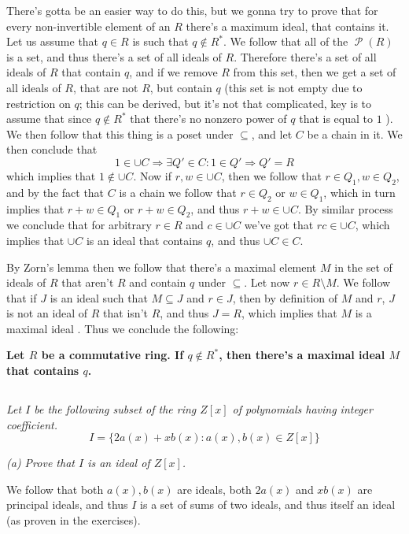 \documentclass[11pt,oneside,titlepage]{book}
\DeclareMathOperator \pow {\mathcal {P}}
\DeclareMathOperator \ra {\Rightarrow}
\newcommand{\set}[1]{\{ #1 \}}
\begin{document}
There's gotta be an easier way to do this, but we gonna try to prove
that for every non-invertible element of an $R$ there's a maximum
ideal, that contains it. Let us assume that $q \in R$ is such that $q
\notin R^*$. We follow that all of the $\pow(R)$ is a set, and thus
there's a set of all ideals of $R$. Therefore there's a set of all
ideals of $R$ that contain $q$, and if we remove $R$ from this set,
then we get a set of all ideals of $R$, that are not $R$, but contain
$q$ (this set is not empty due to restriction on $q$; this can be
derived, but it's not that complicated, key is to assume that since $q
\notin R^*$ that there's no nonzero power of $q$ that is equal to $1$
). We then follow that this thing is a poset under $\subseteq$, and
let $C$ be a chain in it. We then conclude that
$$1 \in \cup C \ra \exists Q' \in C: 1 \in Q' \ra Q' = R$$
which implies that $1 \notin \cup C$. Now if $r, w \in \cup C$, then
we follow that $r \in Q_1, w \in Q_2$, and by the fact that $C$ is a
chain we follow that $r \in Q_2$ or $w \in Q_1$, which in turn implies
that $r + w \in Q_1$ or $r + w \in Q_2$, and thus $r + w \in \cup
C$. By similar process we conclude that for arbitrary $r \in R$ and $c
\in \cup C$ we've got that $rc \in \cup C$, which implies that $\cup
C$ is an ideal that contains $q$, and thus $\cup C \in C$.

By Zorn's lemma then we follow that there's a maximal element $M$ in
the set of ideals of $R$ that aren't $R$ and contain $q$ under
$\subseteq$. Let now $r \in R \setminus M$. We follow that if $J$ is
an ideal such that $M \subseteq J$ and $r \in J$, then by definition
of $M$ and $r$, $J$ is not an ideal of $R$ that isn't $R$, and thus $J
= R$, which implies that $M$ is a maximal ideal . Thus we conclude the
following:

\textbf{Let $R$ be a commutative ring. If $q \notin R^*$, then there's
a maximal ideal $M$ that contains $q$.}


\subsection{}

\textit{Let $I$ be the following subset of the ring $Z[x]$ of
polynomials having integer coefficient.
  $$I = \set{2a(x) + x b(x) : a(x), b(x) \in Z[x]}$$ 
}

\textit{(a) Prove that $I$ is an ideal of $Z[x]$.}

We follow that both $a(x), b(x)$ are ideals, both $2 a(x)$ and $x
b(x)$ are principal ideals, and thus $I$ is a set of sums of two
ideals, and thus itself an ideal (as proven in the exercises).
\end{document}

